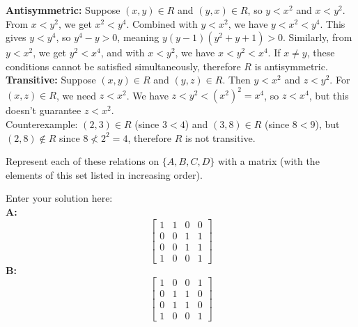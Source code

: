 \documentclass[10pt]{exam}
\begin{document}
\begin{questions}
\begin{solution}
    \textbf{Antisymmetric:} Suppose $(x,y) \in R$ and $(y,x) \in R$, so $y < x^2$ and $x < y^2$.
    From $x < y^2$, we get $x^2 < y^4$. Combined with $y < x^2$, we have $y < x^2 < y^4$.
    This gives $y < y^4$, so $y^4 - y > 0$, meaning $y(y-1)(y^2+y+1) > 0$.
    Similarly, from $y < x^2$, we get $y^2 < x^4$, and with $x < y^2$, we have $x < y^2 < x^4$.
    If $x \neq y$, these conditions cannot be satisfied simultaneously, therefore $R$ is antisymmetric.\\
    
    \textbf{Transitive:} Suppose $(x,y) \in R$ and $(y,z) \in R$. Then $y < x^2$ and $z < y^2$.
    For $(x,z) \in R$, we need $z < x^2$.
    We have $z < y^2 < (x^2)^2 = x^4$, so $z < x^4$, but this doesn't guarantee $z < x^2$.\\
    Counterexample: $(2,3) \in R$ (since $3 < 4$) and $(3,8) \in R$ (since $8 < 9$), but $(2,8) \notin R$ since $8 \not< 2^2 = 4$, therefore $R$ is not transitive.\\
\end{solution}

\question[6] Represent each of these relations on $\{A, B, C, D\}$ with a matrix (with the elements of this set listed in increasing
order).

\begin{solution}
    Enter your solution here:\\
    \textbf{A:}\\
    \[
    \begin{bmatrix}
        1 & 1 & 0 & 0 \\
        0 & 0 & 1 & 1 \\
        0 & 0 & 1 & 1 \\
        1 & 0 & 0 & 1
    \end{bmatrix}
    \]
    \textbf{B:}\\
    \[
    \begin{bmatrix}
        1 & 0 & 0 & 1 \\
        0 & 1 & 1 & 0 \\
        0 & 1 & 1 & 0 \\
        1 & 0 & 0 & 1
    \end{bmatrix}
    \]
\end{solution}


\end{questions}
\end{document}
